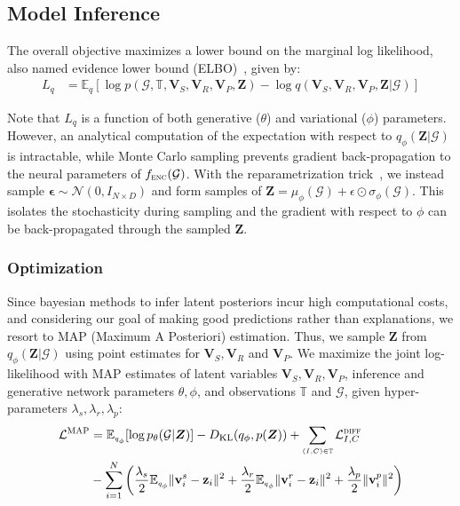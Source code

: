\documentclass[sigconf]{acmart}
\def\rvv{{\mathbf{v}}}
\def\rvz{{\mathbf{z}}}
\def\mV{{\bm{V}}}
\def\mZ{{\bm{Z}}}
\def\gG{{\mathcal{G}}}
\def\gL{{\mathcal{L}}}
\def\gN{{\mathcal{N}}}
\def\sT{{\mathbb{T}}}
\newcommand{\E}{\mathbb{E}}
\newcommand{\KL}{D_{\mathrm{KL}}}
\begin{document}
\subsection{Model Inference}
The overall objective maximizes a lower bound on the marginal log likelihood, also named evidence lower bound (ELBO)~\cite{variational_inf}, given by:
\vspace{-3pt}
\begin{align}
L_q &= \E_{q} [ \log p(\gG,\sT, \mV_S, \mV_R , \mV_{P}, \mZ) -   \log q(\mV_S, \mV_R, \mV_P, \mZ | \gG)] 
\label{eqn:likelihood}
\end{align}

Note that $L_q$ is a function of both generative ($\theta$) and variational ($\phi$) parameters.
However, an analytical computation of the expectation with respect to $q_\phi(\mZ |\gG)$ is intractable, while Monte Carlo sampling prevents gradient back-propagation to the neural parameters of $f_{\textsc{enc}}(\gG)$. 
With the reparametrization trick~\cite{vae}, we instead sample $\mathbf{\epsilon} \sim \gN(0, I_{N \times D})$ and form samples of $\mZ = \mu_{\phi} (\gG)  + \epsilon \odot \sigma_{\phi} (\gG)$.
This isolates the stochasticity during sampling and the gradient with respect to $\phi$ can be back-propagated through the sampled $\mZ$.

\subsubsection{\textbf{Optimization}}
Since bayesian methods to infer latent posteriors incur high computational costs, and considering our goal of making good predictions rather than explanations, we resort to MAP (Maximum A Posteriori) estimation.
Thus, we sample $\mZ$ from $q_{\phi}(\mZ|\gG)$ using point estimates for $\mV_S, \mV_R$ and $\mV_{P}$.
We maximize the joint log-likelihood with MAP estimates of latent variables $\mV_S, \mV_R, \mV_{P}$, inference and generative network parameters $\theta,\phi$, and observations $\sT$ and $\gG$, given hyper-parameters $\lambda_s, \lambda_r, \lambda_p$:
\vspace{-3pt}
\begin{align}
\gL^{ \textsc{MAP}} &= \E_{\scriptscriptstyle q_{\phi}}  [ \log p_\theta (\gG | \mZ)] - \KL{(q_{\phi}, p(\mZ))} + \sum\limits_{\scriptscriptstyle (I,C) \in \sT} \gL^{\textsc{diff}}_{I,C} \label{eqn:objective} \\ \vspace{-3pt}
&- \sum\limits_{i=1}^N  \left( \frac{\lambda_s}{2} \E_{\scriptscriptstyle q_{\phi}} \Vert \rvv^s_i - \rvz_i \Vert^2 + \frac{\lambda_r}{2} \E_{\scriptscriptstyle q_{\phi}} \Vert \rvv^r_i - \rvz_i \Vert^2 + \frac{\lambda_p}{2} \Vert \rvv^p_i \Vert^2 \right) \notag
\end{align}
\end{document}
